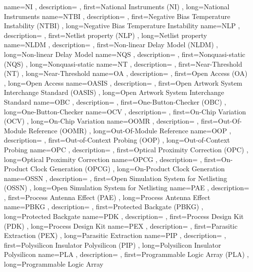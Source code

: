 { name={NI}
, description={}
, first={National Instruments (NI)}
, long={National Instruments}
}
{ name={NTBI}
, description={}
, first={Negative Bias Temperature Instability (NTBI)}
, long={Negative Bias Temperature Instability}
}
{ name={NLP}
, description={}
, first={Netlist property (NLP)}
, long={Netlist property}
}
{ name={NLDM}
, description={}
, first={Non-linear Delay Model (NLDM)}
, long={Non-linear Delay Model}
}
{ name={NQS}
, description={}
, first={Nonquasi-static (NQS)}
, long={Nonquasi-static}
}
{ name={NT}
, description={}
, first={Near-Threshold (NT)}
, long={Near-Threshold}
}
{ name={OA}
, description={}
, first={Open Access (OA)}
, long={Open Access}
}
{ name={OASIS}
, description={}
, first={Open Artwork System Interchange Standard (OASIS)}
, long={Open Artwork System Interchange Standard}
}
{ name={OBC}
, description={}
, first={One-Button-Checker (OBC)}
, long={One-Button-Checker}
}
{ name={OCV}
, description={}
, first={On-Chip Variation (OCV)}
, long={On-Chip Variation}
}
{ name={OOMR}
, description={}
, first={Out-Of-Module Reference (OOMR)}
, long={Out-Of-Module Reference}
}
{ name={OOP}
, description={}
, first={Out-of-Context Probing (OOP)}
, long={Out-of-Context Probing}
}
{ name={OPC}
, description={}
, first={Optical Proximity Correction (OPC)}
, long={Optical Proximity Correction}
}
{ name={OPCG}
, description={}
, first={On-Product Clock Generation (OPCG)}
, long={On-Product Clock Generation}
}
{ name={OSSN}
, description={}
, first={Open Simulation System for Netlisting (OSSN)}
, long={Open Simulation System for Netlisting}
}
{ name={PAE}
, description={}
, first={Process Antenna Effect (PAE)}
, long={Process Antenna Effect}
}
{ name={PBKG}
, description={}
, first={Protected Backgate (PBKG)}
, long={Protected Backgate}
}
{ name={PDK}
, description={}
, first={Process Design Kit (PDK)}
, long={Process Design Kit}
}
{ name={PEX}
, description={}
, first={Parasitic Extraction (PEX)}
, long={Parasitic Extraction}
}
{ name={PIP}
, description={}
, first={Polysilicon Insulator Polysilicon (PIP)}
, long={Polysilicon Insulator Polysilicon}
}
{ name={PLA}
, description={}
, first={Programmable Logic Array (PLA)}
, long={Programmable Logic Array}
}
